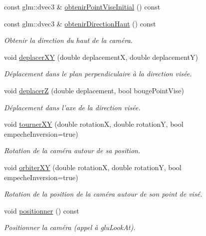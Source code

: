 \begin{DoxyCompactItemize}
const glm\-::dvec3 \& \hyperlink{classvue_1_1_camera_af0a8e31fef378798c296cba418e88b50}{obtenir\-Point\-Vise\-Initial} () const 
\item 
const glm\-::dvec3 \& \hyperlink{classvue_1_1_camera_a51913d2a228cb4b90bb5eb72a4a15970}{obtenir\-Direction\-Haut} () const 
\begin{DoxyCompactList}\small\item\em Obtenir la direction du haut de la caméra. \end{DoxyCompactList}\item 
void \hyperlink{classvue_1_1_camera_aa08801e436ddf90400e632e402183618}{deplacer\-X\-Y} (double deplacement\-X, double deplacement\-Y)
\begin{DoxyCompactList}\small\item\em Déplacement dans le plan perpendiculaire à la direction visée. \end{DoxyCompactList}\item 
void \hyperlink{classvue_1_1_camera_a7e8dfbbf743a74bb0387e140fee09474}{deplacer\-Z} (double deplacement, bool bouge\-Point\-Vise)
\begin{DoxyCompactList}\small\item\em Déplacement dans l'axe de la direction visée. \end{DoxyCompactList}\item 
void \hyperlink{classvue_1_1_camera_a07795ebc629c68f8694b9ae08a53457f}{tourner\-X\-Y} (double rotation\-X, double rotation\-Y, bool empeche\-Inversion=true)
\begin{DoxyCompactList}\small\item\em Rotation de la caméra autour de sa position. \end{DoxyCompactList}\item 
void \hyperlink{classvue_1_1_camera_a5e88216d5d5b31e0e65be9674e5904ef}{orbiter\-X\-Y} (double rotation\-X, double rotation\-Y, bool empeche\-Inversion=true)
\begin{DoxyCompactList}\small\item\em Rotation de la position de la caméra autour de son point de visé. \end{DoxyCompactList}\item 
void \hyperlink{classvue_1_1_camera_a201db90bcebf204990f1dbb6db03b563}{positionner} () const 
\begin{DoxyCompactList}\small\item\em Positionner la caméra (appel à glu\-Look\-At). \end{DoxyCompactList}\end{DoxyCompactItemize}


